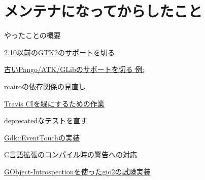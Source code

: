 \section{メンテナになってからしたこと}

\begin{frame}
\begin{block}{やったことの概要}
\begin{itemize}
{\Large
\item
  \href{https://github.com/ruby-gnome2/ruby-gnome2/issues/182}{2.10以前のGTK2のサポートを切る }
\item
  \href{https://github.com/ruby-gnome2/ruby-gnome2/issues/190}{古いPango/ATK/GLibのサポートを切る 例:}
\item
  \href{https://github.com/ruby-gnome2/ruby-gnome2/issues/193}{rcairoの依存関係の見直し }
\item
  \href{https://github.com/ruby-gnome2/ruby-gnome2/issues/200}{Travis CIを緑にするための作業 }
\item
  \href{https://github.com/ruby-gnome2/ruby-gnome2/issues/202}{deprecatedなテストを直す }
\item
  \href{https://github.com/ruby-gnome2/ruby-gnome2/issues/194}{Gdk::EventTouchの実装 }
\item
  \href{https://github.com/ruby-gnome2/ruby-gnome2/pull/205}{C言語拡張のコンパイル時の警告への対応 }
\item
  \href{https://github.com/ruby-gnome2/ruby-gnome2/commit/79f6b15b207371360e7bef73813f60a03cd52f2e}{GObject-Introspectionを使ったgio2の試験実装 }
}
\end{itemize}
\end{block}
\end{frame}
